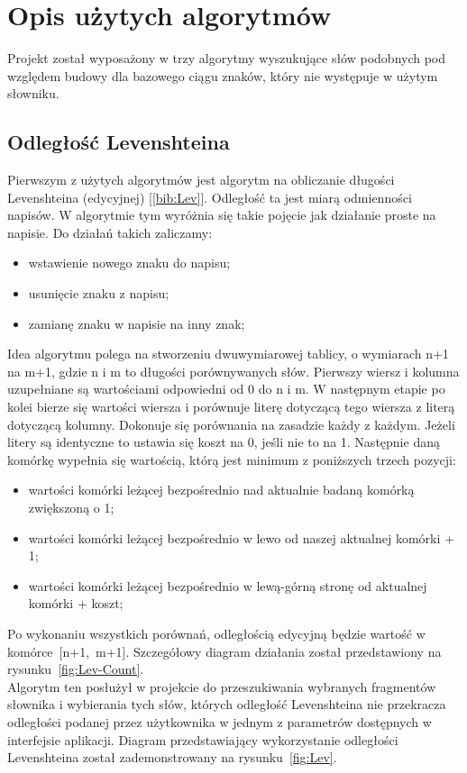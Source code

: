 \chapter{Opis użytych algorytmów}
Projekt został wyposażony w trzy algorytmy wyszukujące słów podobnych pod względem budowy dla bazowego ciągu znaków, który nie występuje w użytym słowniku. 

\section{Odległość Levenshteina} \label{chap:Lev}
Pierwszym z użytych algorytmów jest algorytm na obliczanie długości Levenshteina (edycyjnej) [\ref{bib:Lev}]. Odległość ta jest miarą odmienności napisów. W algorytmie tym wyróżnia się takie pojęcie jak działanie proste na napisie. Do działań takich zaliczamy:
\begin{itemize}
	\item wstawienie nowego znaku do napisu;
	\item usunięcie znaku z napisu;
	\item zamianę znaku w napisie na inny znak;
\end{itemize}

Idea algorytmu polega na stworzeniu dwuwymiarowej tablicy, o wymiarach n+1 na m+1, gdzie n i m to długości porównywanych słów. Pierwszy wiersz i kolumna uzupełniane są wartościami odpowiedni od 0 do n i m. W następnym etapie po kolei bierze się wartości wiersza i porównuje literę dotyczącą tego wiersza z literą dotyczącą kolumny. Dokonuje się porównania na zasadzie każdy z każdym. Jeżeli litery są identyczne to ustawia się koszt na 0, jeśli nie to na 1. Następnie daną komórkę wypełnia się wartością, którą jest minimum z poniższych trzech pozycji:
\begin{itemize}
	\item wartości komórki leżącej bezpośrednio nad aktualnie badaną komórką zwiększoną o 1;
	\item wartości komórki leżącej bezpośrednio w lewo od naszej aktualnej komórki + 1;
	\item wartości komórki leżącej bezpośrednio w lewą-górną stronę od aktualnej komórki + koszt;
\end{itemize}
Po wykonaniu wszystkich porównań, odległością edycyjną będzie wartość w komórce~[n+1,~m+1]. Szczegółowy diagram działania został przedstawiony na rysunku~\ref{fig:Lev-Count}. \\

Algorytm ten posłużył w projekcie do przeszukiwania wybranych fragmentów słownika i wybierania tych słów, których odległość Levenshteina nie przekracza odległości podanej przez użytkownika w jednym z parametrów dostępnych w interfejsie aplikacji. Diagram przedstawiający wykorzystanie odległości Levenshteina został zademonstrowany na rysunku~\ref{fig:Lev}.

